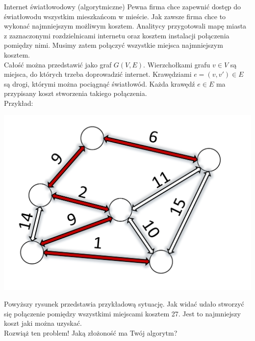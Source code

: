 \begin{exercise}{Internet światłowodowy (algorytmiczne)}{}
Pewna firma chce zapewnić dostęp do światłowodu wszystkim mieszkańcom w mieście. Jak zawsze firma chce to wykonać najmniejszym możliwym kosztem. Analitycy przygotowali mapę miasta z zaznaczonymi rozdzielnicami internetu oraz kosztem instalacji połączenia pomiędzy nimi. Musimy zatem połączyć wszystkie miejsca najmniejszym kosztem. \\

Całość można przedstawić jako graf $G(V, E)$. Wierzchołkami grafu $v \in V$ są miejsca, do których trzeba doprowadzić internet. Krawędziami $e=(v,v') \in E$ są drogi, którymi można pociągnąć światłowód. Każda krawędź $e \in E$ ma przypisany koszt stworzenia takiego połączenia. \\
Przykład:
\begin{center}
\includegraphics[scale=0.3]{Rysunki/zad30.pdf}
\end{center}

Powyższy rysunek przedstawia przykładową sytuację. Jak widać udało stworzyć się połączenie pomiędzy wszystkimi miejscami kosztem 27. Jest to najmniejszy koszt jaki można uzyskać. \\

Rozwiąż ten problem! Jaką złożoność ma Twój algorytm?
\end{exercise}


